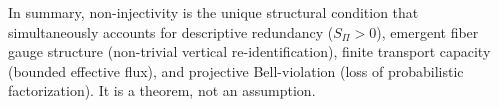   In summary, non-injectivity is the unique structural condition that simultaneously
  accounts for descriptive redundancy ($S_\Pi > 0$), emergent fiber gauge structure
  (non-trivial vertical re-identification), finite transport capacity (bounded effective flux), and
  projective Bell-violation (loss of probabilistic factorization).
  It is a theorem, not an assumption.
